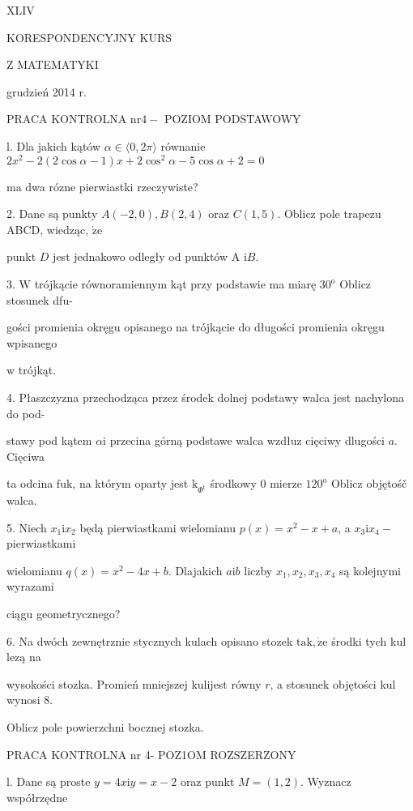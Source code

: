 \documentclass[a4paper,12pt]{article}
\begin{document}
XLIV

KORESPONDENCYJNY KURS

Z MATEMATYKI

grudzień 2014 r.

PRACA KONTROLNA $\mathrm{n}\mathrm{r} 4-$ POZIOM PODSTAWOWY

l. Dla jakich kątów $\alpha\in\langle 0,  2\pi\rangle$ równanie $2x^{2}-2(2\cos\alpha-1)x+2\cos^{2}\alpha-5\cos\alpha+2=0$

ma dwa rózne pierwiastki rzeczywiste?

2. Dane są punkty $A(-2,0), B(2,4)$ oraz $C(1,5)$. Oblicz pole trapezu ABCD, wiedząc, $\dot{\mathrm{z}}\mathrm{e}$

punkt $D$ jest jednakowo odległy od punktów A $\mathrm{i}B.$

3. $\mathrm{W}$ trójkącie równoramiennym kąt przy podstawie ma miarę $30^{\mathrm{o}}$ Oblicz stosunek dfu-

gości promienia okręgu opisanego na trójkącie do długości promienia okręgu wpisanego

$\mathrm{w}$ trójkąt.

4. Płaszczyzna przechodząca przez środek dolnej podstawy walca jest nachylona do pod-

stawy pod kątem $\alpha \mathrm{i}$ przecina górną podstawe walca wzdłuz cięciwy dlugości $a$. Cięciwa

ta odcina $\mathrm{f}\mathrm{u}\mathrm{k}$, na którym oparty jest $\mathrm{k}_{\Phi^{\mathrm{t}}}$ środkowy $0$ mierze $120^{\mathrm{o}}$ Oblicz objętośč walca.

5. Niech $x_{1}\mathrm{i}x_{2}$ będą pierwiastkami wielomianu $p(x)=x^{2}-x+a$, a $x_{3}\mathrm{i}x_{4}-$ pierwiastkami

wielomianu $q(x)=x^{2}-4x+b$. Dlajakich $a\mathrm{i}b$ liczby $x_{1}, x_{2}, x_{3}, x_{4}$ są kolejnymi wyrazami

ciągu geometrycznego?

6. Na dwóch zewnętrznie stycznych kulach opisano stozek $\mathrm{t}\mathrm{a}\mathrm{k}, \dot{\mathrm{z}}\mathrm{e}$ środki tych kul lezą na

wysokości stozka. Promień mniejszej kulijest równy $r$, a stosunek objętości kul wynosi 8.

Oblicz pole powierzchni bocznej stozka.




PRACA KONTROLNA nr 4- POZ1OM ROZSZERZONY

l. Dane są proste $y = 4x \mathrm{i} y = x-2$ oraz punkt $M = (1,2)$. Wyznacz współrzędne
\end{document}
